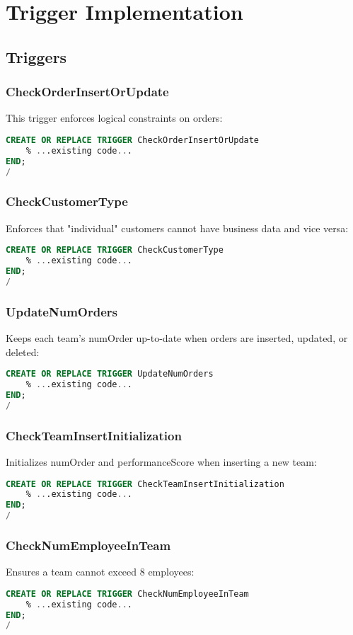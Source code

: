 \chapter{Trigger Implementation}

\section{Triggers}

\subsection*{CheckOrderInsertOrUpdate}
This trigger enforces logical constraints on orders:
\begin{lstlisting}[language=SQL]
CREATE OR REPLACE TRIGGER CheckOrderInsertOrUpdate
    % ...existing code...
END;
/
\end{lstlisting}

\subsection*{CheckCustomerType}
Enforces that "individual" customers cannot have business data and vice versa:
\begin{lstlisting}[language=SQL]
CREATE OR REPLACE TRIGGER CheckCustomerType
    % ...existing code...
END;
/
\end{lstlisting}

\subsection*{UpdateNumOrders}
Keeps each team's numOrder up-to-date when orders are inserted, updated, or deleted:
\begin{lstlisting}[language=SQL]
CREATE OR REPLACE TRIGGER UpdateNumOrders
    % ...existing code...
END;
/
\end{lstlisting}

\subsection*{CheckTeamInsertInitialization}
Initializes numOrder and performanceScore when inserting a new team:
\begin{lstlisting}[language=SQL]
CREATE OR REPLACE TRIGGER CheckTeamInsertInitialization
    % ...existing code...
END;
/
\end{lstlisting}

\subsection*{CheckNumEmployeeInTeam}
Ensures a team cannot exceed 8 employees:
\begin{lstlisting}[language=SQL]
CREATE OR REPLACE TRIGGER CheckNumEmployeeInTeam
    % ...existing code...
END;
/
\end{lstlisting}

